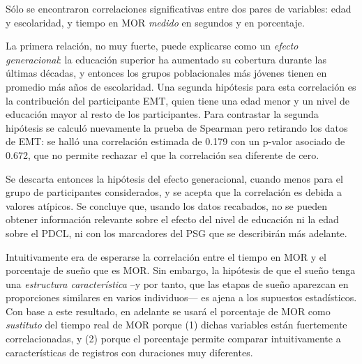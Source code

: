 Sólo se encontraron correlaciones significativas entre dos pares de variables: edad y escolaridad, y tiempo en MOR \textit{medido} en segundos y en porcentaje.

La primera relación, no muy fuerte, puede explicarse como un \textit{efecto generacional}: la educación superior ha aumentado su cobertura durante las últimas décadas, y entonces los grupos poblacionales más jóvenes tienen en promedio más años de escolaridad. 
%
%
Una segunda hipótesis para esta correlación es la contribución del participante EMT, quien tiene una edad menor y un nivel de educación mayor al resto de los participantes.
%
Para contrastar la segunda hipótesis se calculó nuevamente la prueba de Spearman pero retirando los datos de EMT: se halló una correlación estimada de 0.179 con un p-valor asociado de 0.672, que no permite rechazar el que la correlación sea diferente de cero.

Se descarta entonces la hipótesis del efecto generacional, cuando menos para el grupo de participantes considerados, y se acepta que la correlación es debida a valores atípicos. Se concluye que, usando los datos recabados, no se pueden obtener información relevante sobre el efecto del nivel de educación ni la edad sobre el PDCL, ni con los marcadores del PSG que se describirán más adelante.

Intuitivamente era de esperarse la correlación entre el tiempo en MOR y el porcentaje de sueño que es MOR.
%
Sin embargo, la hipótesis de que el sueño tenga una \textit{estructura característica} --y por tanto, que las etapas de sueño aparezcan en proporciones similares en varios individuos--- es ajena a los supuestos estadísticos.
%
Con base a este resultado, en adelante se usará el porcentaje de MOR como \textit{sustituto} del tiempo real de MOR porque (1) dichas variables están fuertemente correlacionadas, y (2) porque el porcentaje permite comparar intuitivamente a características de registros con duraciones muy diferentes.

